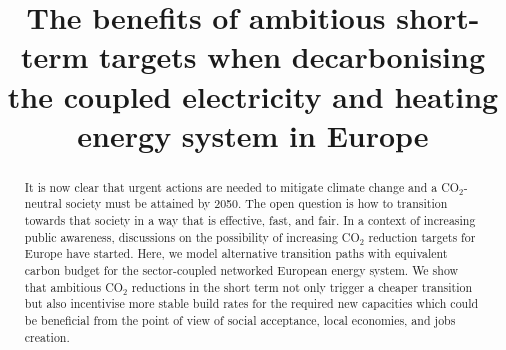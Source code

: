 \documentclass[5p]{elsarticle} %
\begin{document}
\begin{frontmatter}

\title{The benefits of ambitious short-term targets when decarbonising the coupled electricity and heating energy system in Europe}




\begin{abstract}

It is now clear that urgent actions are needed to mitigate climate change and a CO$_2$-neutral society must be attained by 2050. The open question is how to transition towards that society in a way that is effective, fast, and fair. In a context of increasing public awareness, discussions on the possibility of increasing CO$_2$ reduction targets for Europe have started. Here, we model alternative transition paths with equivalent carbon budget for the sector-coupled networked European energy system. We show that ambitious CO$_2$ reductions in the short term not only trigger a cheaper transition but also incentivise more stable build rates for the required new capacities which could be beneficial from the point of view of social acceptance, local economies, and jobs creation.

\end{abstract}

\begin{keyword}


\end{keyword}

\end{frontmatter}
\end{document}
